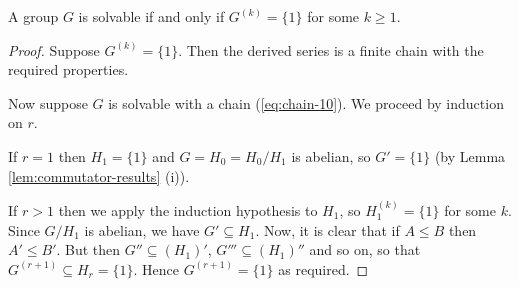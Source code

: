 \begin{lemma}
	A group $G$ is solvable if and only if $G^{(k)} = \{1\}$ for some $k \geq 1$.
	\begin{proof}
		Suppose $G^{(k)} = \{1\}$. Then the derived series is a finite chain with the required properties.
		
		Now suppose $G$ is solvable with a chain (\ref{eq:chain-10}). We proceed by induction on $r$.
		
		If $r = 1$ then $H_1 = \{1\}$ and $G = H_0 = H_0 / H_1$ is abelian, so $G' = \{1\}$ (by Lemma \ref{lem:commutator-results} (i)).
		
		If $r > 1$ then we apply the induction hypothesis to $H_1$, so $H_1^{(k)} = \{1\}$ for some $k$. Since $G / H_1$ is abelian, we have $G' \subseteq H_1$. Now, it is clear that if $A \leq B$ then $A' \leq B'$. But then $G'' \subseteq (H_1)'$, $G''' \subseteq (H_1)''$ and so on, so that $G^{(r + 1)} \subseteq H_r = \{1\}$. Hence $G^{(r + 1)} = \{1\}$ as required.
	\end{proof}
\end{lemma}
